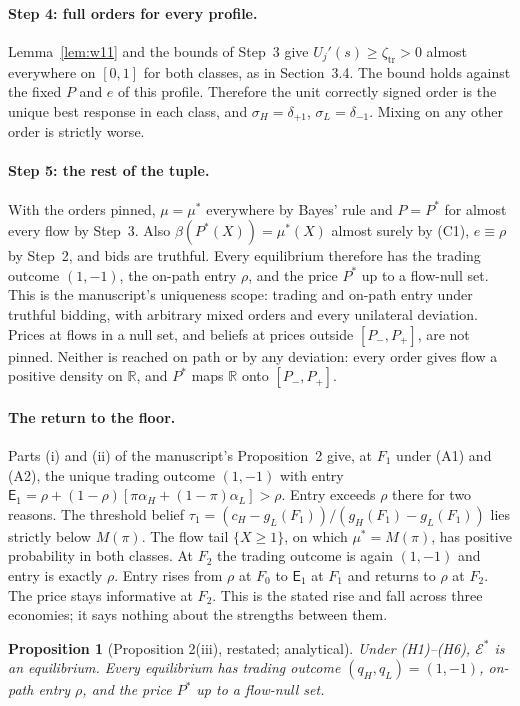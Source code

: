 \documentclass[12pt]{article}
\newtheorem{proposition}{Proposition}
\theoremstyle{remark}
\newcommand{\R}{\mathbb R}
\begin{document}
\paragraph{Step 4: full orders for every profile.}
Lemma~\ref{lem:w11} and the bounds of Step~3 give
$U_j'(s)\ge\zeta_{\mathrm{tr}}>0$ almost everywhere on $[0,1]$ for both classes, as in
Section~3.4. The bound holds against the fixed $P$ and $e$ of this profile. Therefore the unit correctly signed order is the unique
best response in each class, and $\sigma_H=\delta_{+1}$, $\sigma_L=\delta_{-1}$. Mixing on any
other order is strictly worse.

\paragraph{Step 5: the rest of the tuple.}
With the orders pinned, $\mu=\mu^*$ everywhere by Bayes' rule and $P=P^*$ for almost every
flow by Step~3. Also $\beta(P^*(X))=\mu^*(X)$ almost surely by (C1), $e\equiv\rho$ by
Step~2, and bids are truthful. Every equilibrium therefore has the trading outcome $(1,-1)$,
the on-path entry $\rho$, and the price $P^*$ up to a flow-null set. This is the manuscript's
uniqueness scope: trading and on-path entry under truthful bidding, with arbitrary mixed orders
and every unilateral deviation. Prices at flows in a null set, and beliefs at prices outside
$[P_-,P_+]$, are not pinned. Neither is reached on path or by any deviation: every order gives
flow a positive density on $\R$, and $P^*$ maps $\R$ onto $[P_-,P_+]$.

\paragraph{The return to the floor.}
Parts (i) and (ii) of the manuscript's Proposition~2 give, at $F_1$ under (A1) and (A2), the
unique trading outcome $(1,-1)$ with entry
$\mathsf E_1=\rho+(1-\rho)[\pi\alpha_H+(1-\pi)\alpha_L]>\rho$. Entry exceeds $\rho$ there
for two reasons. The threshold belief $\tau_1=(c_H-g_L(F_1))/(g_H(F_1)-g_L(F_1))$ lies strictly
below $M(\pi)$. The flow tail $\{X\ge1\}$, on which $\mu^*=M(\pi)$, has positive probability
in both classes. At $F_2$ the
trading outcome is again $(1,-1)$ and entry is exactly $\rho$. Entry rises from $\rho$ at
$F_0$ to $\mathsf E_1$ at $F_1$ and returns to $\rho$ at $F_2$. The price stays informative at
$F_2$. This is the stated rise and fall across three economies; it says nothing about the
strengths between them.

\begin{proposition}[Proposition 2(iii), restated; analytical]
Under (H1)--(H6), $\mathcal E^*$ is an equilibrium. Every equilibrium has trading outcome
$(q_H,q_L)=(1,-1)$, on-path entry $\rho$, and the price $P^*$ up to a flow-null set.
\end{proposition}
\end{document}
